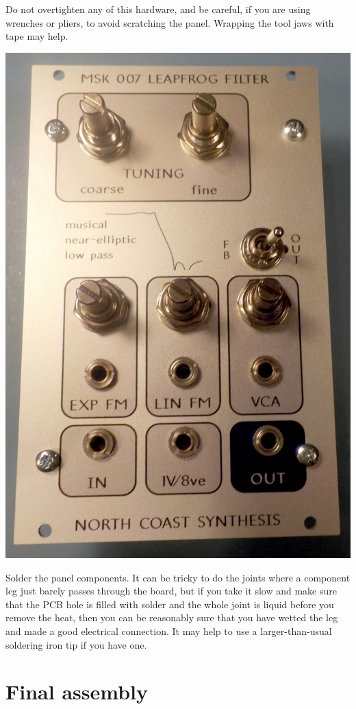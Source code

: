 Do not overtighten any of this hardware, and be careful, if you are
using wrenches or pliers, to avoid scratching the panel.  Wrapping the tool
jaws with tape may help.

\nopagebreak
\noindent\includegraphics[width=\linewidth]{panel-hardware.jpg}

Solder the panel components.  It can be tricky to do the joints where a
component leg just barely passes through the board, but if you take it slow
and make sure that the PCB hole is filled with solder and the whole joint is
liquid before you remove the heat, then you can be reasonably sure that you
have wetted the leg and made a good electrical connection.  It may help to
use a larger-than-usual soldering iron tip if you have one.

\pagebreak

\section{Final assembly}

